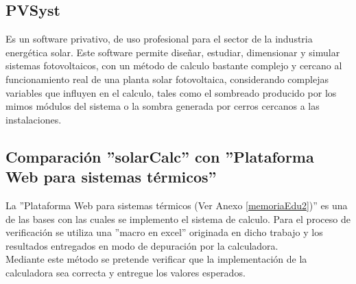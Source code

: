 \subsection{PVSyst}
Es un software privativo, de uso profesional para el sector de la industria energética solar. Este software permite diseñar, estudiar, dimensionar y simular sistemas fotovoltaicos, con un método de calculo bastante complejo y cercano al funcionamiento real de una planta solar fotovoltaica, considerando complejas variables que influyen en el calculo, tales como el sombreado producido por los mimos módulos del sistema o la sombra generada por cerros cercanos a las instalaciones.\\

\subsection{Comparación ''solarCalc'' con ''Plataforma Web para sistemas térmicos''}
La ''Plataforma Web para sistemas térmicos (Ver Anexo \ref{memoriaEdu2})'' es una de las bases con las cuales se implemento el sistema de calculo. Para el proceso de verificación se utiliza una ''macro en excel'' originada en dicho trabajo y los resultados entregados en modo de depuración por la calculadora.\\
Mediante este método se pretende verificar que la implementación de la calculadora sea correcta y entregue los valores esperados.


